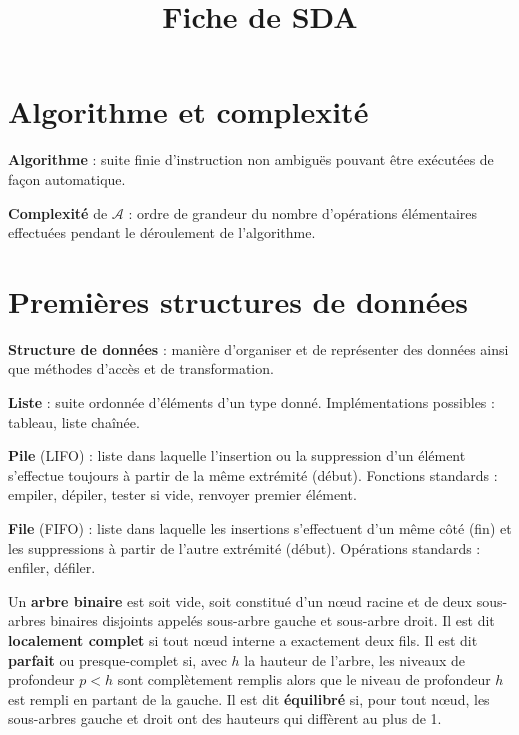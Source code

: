 \documentclass[a4paper,11pt,twocolumn]{article}
\title{\vspace{-0.8cm} \textbf{Fiche de SDA} \vspace{-1cm}}
\date{}
\begin{document}
\maketitle

\section{Algorithme et complexité}

	\begin{defn}
	\textbf{Algorithme} : suite finie d'instruction non ambiguës pouvant être exécutées de façon automatique.
	\end{defn}

	\begin{defn}
	\textbf{Complexité} de $\mathcal{A}$ : ordre de grandeur du nombre d'opérations élémentaires effectuées pendant le déroulement de l’algorithme.
	\end{defn}

\section{Premières structures de données}

	\begin{defn}
	\textbf{Structure de données} : manière d’organiser et de représenter des données ainsi que méthodes d’accès et de transformation.
	\end{defn}

	\begin{defn}
	\textbf{Liste} : suite ordonnée d’éléments d’un type donné.
	Implémentations possibles : tableau, liste chaînée.
	\end{defn}

	\begin{defn}
	\textbf{Pile} (LIFO) : liste dans laquelle l’insertion ou la suppression d’un élément s’effectue toujours à partir de la même extrémité (début).
	Fonctions standards : empiler, dépiler, tester si vide, renvoyer premier élément.
	\end{defn}

	\begin{defn}
	\textbf{File} (FIFO) : liste dans laquelle les insertions s’effectuent d’un même côté (fin) et les suppressions à partir de l’autre extrémité (début).
	Opérations standards : enfiler, défiler.
	\end{defn}

	\begin{defn}
	Un \textbf{arbre binaire} est soit vide, soit constitué d’un nœud racine et de deux sous-arbres binaires disjoints appelés sous-arbre gauche et sous-arbre droit.
	Il est dit \textbf{localement complet} si tout nœud interne a exactement deux fils.
	Il est dit \textbf{parfait} ou presque-complet si, avec $h$ la hauteur de l’arbre, les niveaux de profondeur $p < h$ sont complètement remplis alors que le niveau de profondeur $h$ est rempli en partant de la gauche.
	Il est dit \textbf{équilibré} si, pour tout nœud, les sous-arbres gauche et droit ont des hauteurs qui diffèrent au plus de 1.
	\end{defn}
\end{document}

